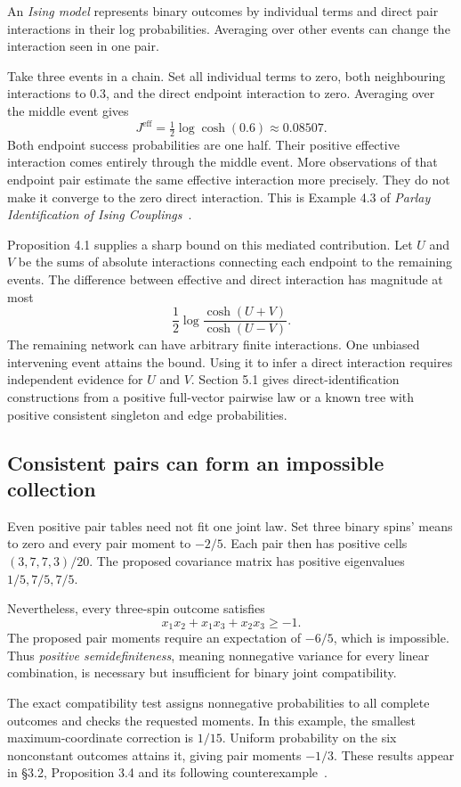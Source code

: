\documentclass{momentum}
\begin{document}
An \emph{Ising model} represents binary outcomes by individual terms and direct pair interactions in their log probabilities. Averaging over other events can change the interaction seen in one pair.

Take three events in a chain. Set all individual terms to zero, both neighbouring interactions to $0.3$, and the direct endpoint interaction to zero. Averaging over the middle event gives
\[
J^{\mathrm{eff}}=\tfrac12\log\cosh(0.6)\approx0.08507.
\]
Both endpoint success probabilities are one half. Their positive effective interaction comes entirely through the middle event. More observations of that endpoint pair estimate the same effective interaction more precisely. They do not make it converge to the zero direct interaction. This is Example 4.3 of \emph{Parlay Identification of Ising Couplings}~\cite{parlay}.

Proposition 4.1 supplies a sharp bound on this mediated contribution. Let $U$ and $V$ be the sums of absolute interactions connecting each endpoint to the remaining events. The difference between effective and direct interaction has magnitude at most
\[
\frac12\log\frac{\cosh(U+V)}{\cosh(U-V)}.
\]
The remaining network can have arbitrary finite interactions. One unbiased intervening event attains the bound. Using it to infer a direct interaction requires independent evidence for $U$ and $V$. Section 5.1 gives direct-identification constructions from a positive full-vector pairwise law or a known tree with positive consistent singleton and edge probabilities.

\subsection{Consistent pairs can form an impossible collection}

Even positive pair tables need not fit one joint law. Set three binary spins' means to zero and every pair moment to $-2/5$. Each pair then has positive cells $(3,7,7,3)/20$. The proposed covariance matrix has positive eigenvalues $1/5,7/5,7/5$.

Nevertheless, every three-spin outcome satisfies
\[
x_1x_2+x_1x_3+x_2x_3\geq-1.
\]
The proposed pair moments require an expectation of $-6/5$, which is impossible. Thus \emph{positive semidefiniteness}, meaning nonnegative variance for every linear combination, is necessary but insufficient for binary joint compatibility.

The exact compatibility test assigns nonnegative probabilities to all complete outcomes and checks the requested moments. In this example, the smallest maximum-coordinate correction is $1/15$. Uniform probability on the six nonconstant outcomes attains it, giving pair moments $-1/3$. These results appear in \S3.2, Proposition 3.4 and its following counterexample~\cite{parlay}.
\end{document}
